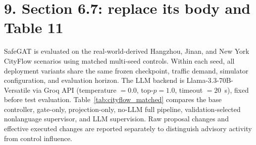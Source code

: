 \documentclass[10pt]{article}
\begin{document}
\section*{9. Section 6.7: replace its body and Table 11}
SafeGAT is evaluated on the real-world-derived Hangzhou, Jinan, and New York
CityFlow scenarios using matched multi-seed controls. Within each seed, all
deployment variants share the same frozen checkpoint, traffic demand, simulator
configuration, and evaluation horizon. The LLM backend is Llama-3.3-70B-Versatile via Groq API (temperature $=0.0$, top-$p=1.0$, timeout $=20$~s), fixed before
test evaluation. Table~\ref{tab:cityflow_matched} compares the base controller,
gate-only, projection-only, no-LLM full pipeline, validation-selected nonlanguage
supervisor, and LLM supervision. Raw proposal changes and effective executed
changes are reported separately to distinguish advisory activity from control influence.
\end{document}
